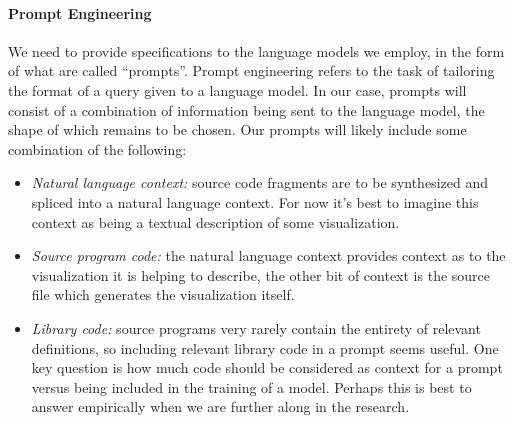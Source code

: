 \paragraph*{Prompt Engineering}
We need to provide specifications to the language models we employ, in the form of what are called
``prompts''. Prompt engineering refers to the task of tailoring the format of a query given to a 
language model. In our case, prompts will consist of a combination of information being sent to the
language model, the shape of which remains to be chosen.
Our prompts will likely include some combination of the following:
\begin{itemize}
   \item \textit{Natural language context:} source code fragments are to be synthesized and spliced into a natural language context. For now it's best to imagine this context as being a textual description of some visualization.
   \item \textit{Source program code:} the natural language context provides context as to the visualization it is helping to describe, the other bit of context is the source file which generates the visualization itself.
   \item \textit{Library code:} source programs very rarely contain the entirety of relevant definitions, so including relevant library code in a prompt seems useful. One key question is how much code should be considered as context for a prompt versus being included in the training of a model. Perhaps this is best to answer empirically when we are further along in the research.
\end{itemize}